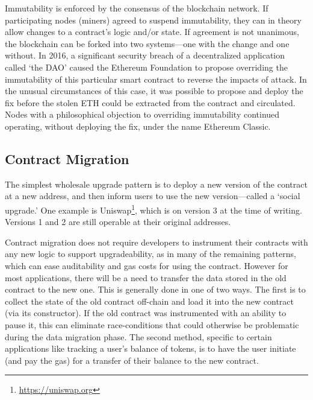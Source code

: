 Immutability is enforced by the consensus of the blockchain network. If participating nodes (\eg miners) agreed to suspend immutability, they can in theory allow changes to a contract's logic and/or state. If agreement is not unanimous, the blockchain can be forked into two systems---one with the change and one without. In 2016, a significant security breach of a decentralized application called `the DAO' caused the Ethereum Foundation to propose overriding the immutability of this particular smart contract to reverse the impacts of attack. In the unusual circumstances of this case, it was possible to propose and deploy the fix before the stolen ETH could be extracted from the contract and circulated. Nodes with a philosophical objection to overriding immutability continued operating, without deploying the fix, under the name Ethereum Classic.



\subsection{Contract Migration}
\label{sec:migration}

The simplest wholesale upgrade pattern is to deploy a new version of the contract at a new address, and then inform users to use the new version---called a `social upgrade.' One example is Uniswap\footnote{\url{https://uniswap.org}}, which is on version 3 at the time of writing. Versions 1 and 2 are still operable at their original addresses. 

Contract migration does not require developers to instrument their contracts with any new logic to support upgradeability, as in many of the remaining patterns, which can ease auditability and gas costs for using the contract. However for most applications, there will be a need to transfer the data stored in the old contract to the new one. This is generally done in one of two ways. The first is to collect the state of the old contract off-chain and load it into the new contract (\eg via its constructor). If the old contract was instrumented with an ability to pause it, this can eliminate race-conditions that could otherwise be problematic during the data migration phase. The second method, specific to certain applications like tracking a user's balance of tokens, is to have the user initiate (and pay the gas) for a transfer of their balance to the new contract.
 
